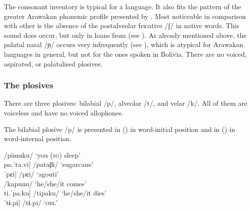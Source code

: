The consonant inventory is typical for a  language. It also fits the pattern of the greater Arawakan phonemic profile presented by \citet[76]{Aikhenvald1999}. Most noticeable in comparison with other  is the absence of the postalveolar fricative /ʃ/ in native words. This sound does occur, but only in loans from  (see ). As already mentioned above, the palatal nasal /ɲ/ occurs very infrequently (see ), which is atypical for Arawakan languages in general, but not for the ones spoken in Bolivia. There are no voiced, aspirated, or palatalised plosives. 

\begin{table}
\caption{Consonant inventory}
\label{table:consonants}
\end{table}


\subsubsection{The plosives} \label{Plosives}
There are three plosives: bilabial /p/, alveolar /t/, and velar /k/. All of them are voiceless and have no voiced allophones.


 The bilabial plosive /p/ is presented in () in word-initial position and in () in word-internal position.

\ea\label{ex:p}
\ea\label{ex:p.1}   \tab[pi.ˈmu.ko] \tab  /pimuku/ \tab  ‘you (\textsc{sg}) sleep’\\
     \tab{[}pa.ˈta.vi] \tab /pataβi/ \tab ‘sugarcane’\\
     \tab{[}ˈpɛi] \tab\tab /pɛi/ \tab\tab ‘agouti’\\
\ex\label{ex:p.2}    \tab [ˈka.pu.nʊ] \tab  /kapunu/ \tab  ‘he/she/it comes’\\
     \tab{[}ti.ˈpa.ku] \tab /tipaku/ \tab ‘he/she/it dies’\\
     \tab{[}ˈtɨ.pi] \tab /tɨ.pi/ \tab\tab ‘\textsc{obl}’\\%
\z
\xe



